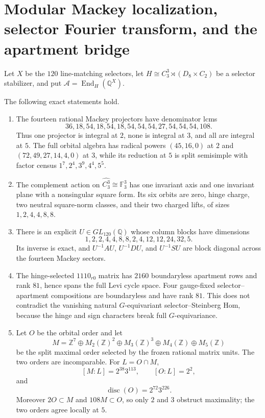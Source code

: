 \section{Modular Mackey localization, selector Fourier transform, and the apartment bridge}
\label{sec:bt1400-bt1404-five-frontiers}

Let $X$ be the $120$ line-matching selectors, let
$H\cong C_3^3\rtimes(D_8\times C_2)$ be a selector stabilizer, and put
$\mathcal A=\operatorname{End}_H(\mathbb Q^X)$.

\begin{theorem}
The following exact statements hold.
\begin{enumerate}
\item The fourteen rational Mackey projectors have denominator lcms
\[
36,18,54,18,54,18,54,54,54,27,54,54,54,108.
\]
Thus one projector is integral at $2$, none is integral at $3$, and all are
integral at $5$.  The full orbital algebra has radical powers
$(45,16,0)$ at $2$ and $(72,49,27,14,4,0)$ at $3$, while its reduction at
$5$ is split semisimple with factor census $1^7,2^4,3^9,4^4,5^5$.

\item The complement action on $\widehat{C_3^3}\cong\mathbb F_3^3$ has one
invariant axis and one invariant plane with a nonsingular square form.  Its
six orbits are zero, hinge charge, two neutral square-norm classes, and their
two charged lifts, of sizes $1,2,4,4,8,8$.

\item There is an explicit $U\in GL_{120}(\mathbb Q)$ whose column blocks have
dimensions
\[
1,2,2,4,4,8,8,2,4,12,12,24,32,5.
\]
Its inverse is exact, and $U^{-1}AU$, $U^{-1}DU$, and $U^{-1}SU$ are block
diagonal across the fourteen Mackey sectors.

\item The hinge-selected $1110_{r0}$ matrix has $2160$ boundaryless apartment
rows and rank $81$, hence spans the full Levi cycle space.  Four gauge-fixed
selector--apartment compositions are boundaryless and have rank $81$.  This
does not contradict the vanishing natural $G$-equivariant selector--Steinberg
Hom, because the hinge and sign characters break full $G$-equivariance.

\item Let $O$ be the orbital order and let
\[
M=\mathbb Z^7\oplus M_2(\mathbb Z)^2\oplus M_3(\mathbb Z)^3
\oplus M_4(\mathbb Z)\oplus M_5(\mathbb Z)
\]
be the split maximal order selected by the frozen rational matrix units.
The two orders are incomparable.  For $L=O\cap M$,
\[
[M:L]=2^{38}3^{113},\qquad [O:L]=2^2,
\]
and
\[
\operatorname{disc}(O)=2^{72}3^{226}.
\]
Moreover $2O\subset M$ and $108M\subset O$, so only $2$ and $3$ obstruct
maximality; the two orders agree locally at $5$.
\end{enumerate}
\end{theorem}

